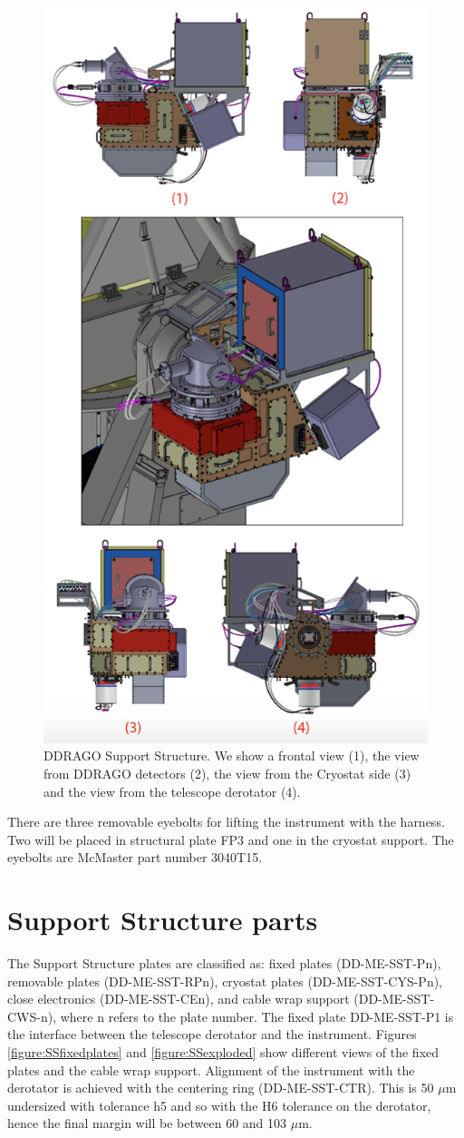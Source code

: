 \documentclass{report}
\newcommand{\micron}{\mbox{$\mu$m}}
\begin{document}
\begin{figure}
\centering
\includegraphics[width=0.7\linewidth]{figures/SS.png}
\caption{DDRAGO Support Structure. We show a frontal view (1), the view from DDRAGO detectors (2), the view from the Cryostat side (3) and the view from the telescope derotator (4).}
\label{figure:SS}
\end{figure}

There are three removable eyebolts for lifting the instrument with the harness. Two will be placed in structural plate FP3 and one in the cryostat support. The eyebolts are McMaster part number 3040T15.

\clearpage

\section{Support Structure parts}

The Support Structure plates are classified as: fixed plates (DD-ME-SST-Pn), removable plates (DD-ME-SST-RPn), cryostat plates (DD-ME-SST-CYS-Pn), close electronics (DD-ME-SST-CEn), and cable wrap support (DD-ME-SST-CWS-n), where n refers to the plate number. The fixed plate DD-ME-SST-P1 is the interface between the telescope derotator and the instrument. Figures \ref{figure:SSfixedplates} and \ref{figure:SSexploded} show different views of the fixed plates and the cable wrap support. Alignment of the instrument with the derotator is achieved with the centering ring (DD-ME-SST-CTR). This is 50 {\micron} undersized with tolerance h5 and so with the H6 tolerance on the derotator, hence the final margin will be between 60 and 103 \micron.
\end{document}
